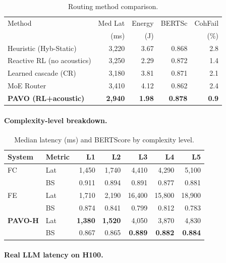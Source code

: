 \documentclass{article}
\begin{document}
\begin{table}[H]
\centering
\caption{Routing method comparison.}
\label{tab:ablation_routing}
\small
\begin{tabular}{lrrrr}
\toprule
Method & Med Lat & Energy & BERTSc & CohFail \\
 & (ms) & (J) & & (\%) \\
\midrule
Heuristic (Hyb-Static)    & 3{,}220 & 3.67 & 0.868 & 2.8 \\
Reactive RL (no acoustics) & 3{,}250 & 2.29 & 0.872 & 1.4 \\
Learned cascade (CR)      & 3{,}180 & 3.81 & 0.871 & 2.1 \\
MoE Router                & 3{,}410 & 4.12 & 0.862 & 2.4 \\
\textbf{PAVO (RL+acoustic)} & \textbf{2{,}940} & \textbf{1.98} & \textbf{0.878} & \textbf{0.9} \\
\bottomrule
\end{tabular}
\end{table}

\paragraph{Complexity-level breakdown.}

\begin{table}[H]
\centering
\caption{Median latency (ms) and BERTScore by complexity level.}
\label{tab:complexity}
\small
\begin{tabular}{llrrrrr}
\toprule
System & Metric & L1 & L2 & L3 & L4 & L5 \\
\midrule
FC  & Lat & 1{,}450 & 1{,}740 & 4{,}410 & 4{,}290 & 5{,}100 \\
    & BS  & 0.911 & 0.894 & 0.891 & 0.877 & 0.881 \\
FE  & Lat & 1{,}710 & 2{,}190 & 16{,}400 & 15{,}800 & 18{,}900 \\
    & BS  & 0.874 & 0.841 & 0.799 & 0.812 & 0.783 \\
\textbf{PAVO-H} & Lat & \textbf{1{,}380} & \textbf{1{,}520} & 4{,}050 & 3{,}870 & 4{,}830 \\
    & BS  & 0.867 & 0.865 & \textbf{0.889} & \textbf{0.882} & \textbf{0.884} \\
\bottomrule
\end{tabular}
\end{table}

\paragraph{Real LLM latency on H100.}
\end{document}
